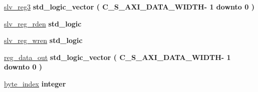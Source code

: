\begin{DoxyCompactItemize}
\item 
\hypertarget{group__my_g_p_i_o_gac96ceac1866c548c7768285cab3dfcb0}{\hyperlink{group__my_g_p_i_o_gac96ceac1866c548c7768285cab3dfcb0}{slv\+\_\+reg3} {\bfseries \textcolor{vhdlchar}{std\+\_\+logic\+\_\+vector}\textcolor{vhdlchar}{ }\textcolor{vhdlchar}{(}\textcolor{vhdlchar}{ }\textcolor{vhdlchar}{ }\textcolor{vhdlchar}{ }\textcolor{vhdlchar}{ }\textcolor{vhdlchar}{C\+\_\+\+S\+\_\+\+A\+X\+I\+\_\+\+D\+A\+T\+A\+\_\+\+W\+I\+D\+T\+H}\textcolor{vhdlchar}{-\/}\textcolor{vhdlchar}{ } \textcolor{vhdldigit}{1} \textcolor{vhdlchar}{ }\textcolor{vhdlchar}{downto}\textcolor{vhdlchar}{ }\textcolor{vhdlchar}{ } \textcolor{vhdldigit}{0} \textcolor{vhdlchar}{ }\textcolor{vhdlchar}{)}\textcolor{vhdlchar}{ }} }\label{group__my_g_p_i_o_gac96ceac1866c548c7768285cab3dfcb0}

\item 
\hypertarget{group__my_g_p_i_o_ga926db8eeef0238555606fd62a7a560c9}{\hyperlink{group__my_g_p_i_o_ga926db8eeef0238555606fd62a7a560c9}{slv\+\_\+reg\+\_\+rden} {\bfseries \textcolor{vhdlchar}{std\+\_\+logic}\textcolor{vhdlchar}{ }} }\label{group__my_g_p_i_o_ga926db8eeef0238555606fd62a7a560c9}

\item 
\hypertarget{group__my_g_p_i_o_gaad4e436bcbbc19fe53c2ec05286f1fd3}{\hyperlink{group__my_g_p_i_o_gaad4e436bcbbc19fe53c2ec05286f1fd3}{slv\+\_\+reg\+\_\+wren} {\bfseries \textcolor{vhdlchar}{std\+\_\+logic}\textcolor{vhdlchar}{ }} }\label{group__my_g_p_i_o_gaad4e436bcbbc19fe53c2ec05286f1fd3}

\item 
\hypertarget{group__my_g_p_i_o_gaa3772389d05ea4ed4ef3659c59ecc979}{\hyperlink{group__my_g_p_i_o_gaa3772389d05ea4ed4ef3659c59ecc979}{reg\+\_\+data\+\_\+out} {\bfseries \textcolor{vhdlchar}{std\+\_\+logic\+\_\+vector}\textcolor{vhdlchar}{ }\textcolor{vhdlchar}{(}\textcolor{vhdlchar}{ }\textcolor{vhdlchar}{ }\textcolor{vhdlchar}{ }\textcolor{vhdlchar}{ }\textcolor{vhdlchar}{C\+\_\+\+S\+\_\+\+A\+X\+I\+\_\+\+D\+A\+T\+A\+\_\+\+W\+I\+D\+T\+H}\textcolor{vhdlchar}{-\/}\textcolor{vhdlchar}{ } \textcolor{vhdldigit}{1} \textcolor{vhdlchar}{ }\textcolor{vhdlchar}{downto}\textcolor{vhdlchar}{ }\textcolor{vhdlchar}{ } \textcolor{vhdldigit}{0} \textcolor{vhdlchar}{ }\textcolor{vhdlchar}{)}\textcolor{vhdlchar}{ }} }\label{group__my_g_p_i_o_gaa3772389d05ea4ed4ef3659c59ecc979}

\item 
\hypertarget{group__my_g_p_i_o_gac6ee69e440f203370b48953fe931a36c}{\hyperlink{group__my_g_p_i_o_gac6ee69e440f203370b48953fe931a36c}{byte\+\_\+index} {\bfseries \textcolor{vhdlchar}{integer}\textcolor{vhdlchar}{ }} }\label{group__my_g_p_i_o_gac6ee69e440f203370b48953fe931a36c}


\end{DoxyCompactItemize}
